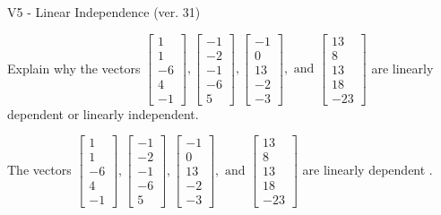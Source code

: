 \begin{exercise}
  \begin{exerciseTitle}V5 - Linear Independence (ver. 31)\end{exerciseTitle}
  \begin{exerciseStatement}
    Explain why the vectors \(\left[\begin{array}{r}
1 \\
1 \\
-6 \\
4 \\
-1
\end{array}\right] , \left[\begin{array}{r}
-1 \\
-2 \\
-1 \\
-6 \\
5
\end{array}\right] , \left[\begin{array}{r}
-1 \\
0 \\
13 \\
-2 \\
-3
\end{array}\right] , \text{ and } \left[\begin{array}{r}
13 \\
8 \\
13 \\
18 \\
-23
\end{array}\right]\) are linearly dependent or linearly independent.	


  \end{exerciseStatement}
  \begin{exerciseAnswer}
   The vectors \(\left[\begin{array}{r}
1 \\
1 \\
-6 \\
4 \\
-1
\end{array}\right] , \left[\begin{array}{r}
-1 \\
-2 \\
-1 \\
-6 \\
5
\end{array}\right] , \left[\begin{array}{r}
-1 \\
0 \\
13 \\
-2 \\
-3
\end{array}\right] , \text{ and } \left[\begin{array}{r}
13 \\
8 \\
13 \\
18 \\
-23
\end{array}\right]\) are 
  	 linearly dependent  .
  


  \end{exerciseAnswer}
\end{exercise}